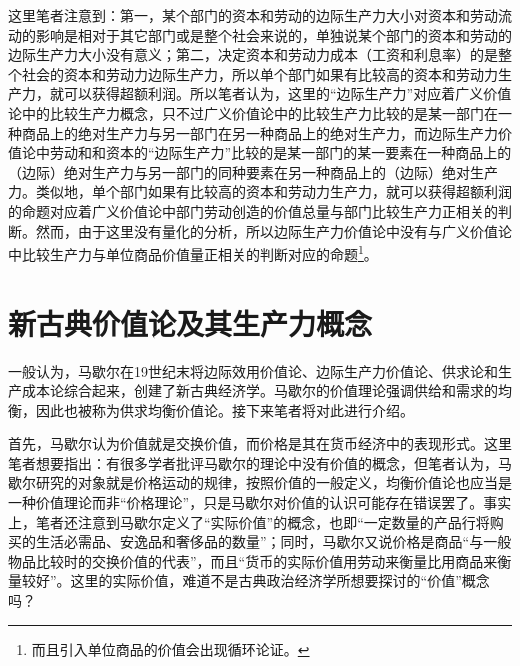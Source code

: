 这里笔者注意到：第一，某个部门的资本和劳动的边际生产力大小对资本和劳动流动的影响是相对于其它部门或是整个社会来说的，单独说某个部门的资本和劳动的边际生产力大小没有意义；第二，决定资本和劳动力成本（工资和利息率）的是整个社会的资本和劳动力边际生产力，所以单个部门如果有比较高的资本和劳动力生产力，就可以获得超额利润\cite[255]{KeLaKeCaiFuDeFenPei1983}。所以笔者认为，这里的“边际生产力”对应着广义价值论中的比较生产力概念，只不过广义价值论中的比较生产力比较的是某一部门在一种商品上的绝对生产力与另一部门在另一种商品上的绝对生产力，而边际生产力价值论中劳动和和资本的“边际生产力”比较的是某一部门的某一要素在一种商品上的（边际）绝对生产力与另一部门的同种要素在另一种商品上的（边际）绝对生产力。类似地，单个部门如果有比较高的资本和劳动力生产力，就可以获得超额利润的命题对应着广义价值论中部门劳动创造的价值总量与部门比较生产力正相关的判断。然而，由于这里没有量化的分析，所以边际生产力价值论中没有与广义价值论中比较生产力与单位商品价值量正相关的判断对应的命题\footnote{而且引入单位商品的价值会出现循环论证。}。

\section{新古典价值论及其生产力概念}

一般认为，马歇尔在19世纪末将边际效用价值论、边际生产力价值论、供求论和生产成本论综合起来，创建了新古典经济学\cite[295]{YanZhiJieXiFangJingJiXueShuoShiJiaoChengDiErBan2013}\cite[340]{YanZhiJieCongBianJiGeMingDaoKaiEnSiGeMing2022}\cite[i]{MaXieErJingJiXueYuanLi2019}\cite[183-184]{CaiJiMingCongGuDianZhengZhiJingJiXueDaoZhongGuoTeSeSheHuiZhuYiZhengZhiJingJiXueJiYuZhongGuoShiJiaoDeZhengZhiJingJiXueYanBianShangCe2023}。马歇尔的价值理论强调供给和需求的均衡，因此也被称为供求均衡价值论\cite[390]{YanZhiJieCongBianJiGeMingDaoKaiEnSiGeMing2022}。接下来笔者将对此进行介绍。

首先，马歇尔认为价值就是交换价值，而价格是其在货币经济中的表现形式\cite[86-87]{MaXieErJingJiXueYuanLi2019}。这里笔者想要指出：有很多学者批评马歇尔的理论中没有价值的概念\cite[299]{YanZhiJieXiFangJingJiXueShuoShiJiaoChengDiErBan2013}\cite[v]{MaXieErJingJiXueYuanLi2019}，但笔者认为，马歇尔研究的对象就是价格运动的规律，按照价值的一般定义，均衡价值论也应当是一种价值理论而非“价格理论”，只是马歇尔对价值的认识可能存在错误罢了。事实上，笔者还注意到马歇尔定义了“实际价值”的概念，也即“一定数量的产品行将购买的生活必需品、安逸品和奢侈品的数量”\cite[720]{MaXieErJingJiXueYuanLi2019}；同时，马歇尔又说价格是商品“与一般物品比较时的交换价值的代表”\cite[87]{MaXieErJingJiXueYuanLi2019}，而且“货币的实际价值用劳动来衡量比用商品来衡量较好”\cite[87]{MaXieErJingJiXueYuanLi2019}。这里的实际价值，难道不是古典政治经济学所想要探讨的“价值”概念吗？


